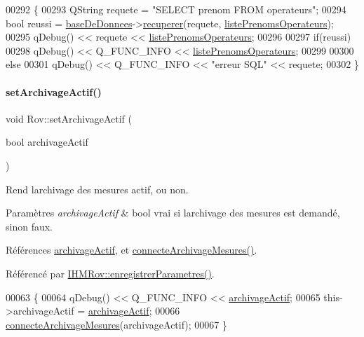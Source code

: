 \begin{DoxyCode}
00292 \{
00293     QString requete = \textcolor{stringliteral}{"SELECT prenom FROM operateurs"};
00294     \textcolor{keywordtype}{bool} reussi = \hyperlink{class_rov_a5a9a824cd100947c75d0951eb9e1f90c}{baseDeDonnees}->\hyperlink{class_base_de_donnees_a77539baad389f5acf754cd2cd452403e}{recuperer}(requete, 
      \hyperlink{class_rov_a1e059749c13ed4ee9c0ec9168e79a3be}{listePrenomsOperateurs});
00295     qDebug() << requete << \hyperlink{class_rov_a1e059749c13ed4ee9c0ec9168e79a3be}{listePrenomsOperateurs};
00296 
00297     \textcolor{keywordflow}{if}(reussi)
00298         qDebug() << Q\_FUNC\_INFO << \hyperlink{class_rov_a1e059749c13ed4ee9c0ec9168e79a3be}{listePrenomsOperateurs};
00299 
00300     \textcolor{keywordflow}{else}
00301         qDebug() << Q\_FUNC\_INFO << \textcolor{stringliteral}{"erreur SQL"} << requete;
00302 \}
\end{DoxyCode}
\mbox{\label{class_rov_abbe2eb87a00b651c8259c0c7abca3edd}} 
\paragraph{\texorpdfstring{set\+Archivage\+Actif()}{setArchivageActif()}}
{\footnotesize\ttfamily void Rov\+::set\+Archivage\+Actif (\begin{DoxyParamCaption}\item[{bool}]{archivage\+Actif }\end{DoxyParamCaption})}

Rend l\textquotesingle{}archivage des mesures actif, ou non.


\begin{DoxyParams}{Paramètres}
{\em archivage\+Actif} & bool vrai si l\textquotesingle{}archivage des mesures est demandé, sinon faux. \\
\hline
\end{DoxyParams}


Références \hyperlink{class_rov_a659da5fe3636356b006a8e08a8433dd3}{archivage\+Actif}, et \hyperlink{class_rov_a738965ca84678b506b3d6a326c48e9e3}{connecte\+Archivage\+Mesures()}.



Référencé par \hyperlink{class_i_h_m_rov_a94d31f4e748f3e4549eab42c8bc7e367}{I\+H\+M\+Rov\+::enregistrer\+Parametres()}.


\begin{DoxyCode}
00063 \{
00064     qDebug() << Q\_FUNC\_INFO << \hyperlink{class_rov_a659da5fe3636356b006a8e08a8433dd3}{archivageActif};
00065     this->archivageActif = \hyperlink{class_rov_a659da5fe3636356b006a8e08a8433dd3}{archivageActif};
00066     \hyperlink{class_rov_a738965ca84678b506b3d6a326c48e9e3}{connecteArchivageMesures}(archivageActif);
00067 \}
\end{DoxyCode}
\mbox{\label{class_rov_acb3ecbb04ace455526206d3c05b712fd}} 
